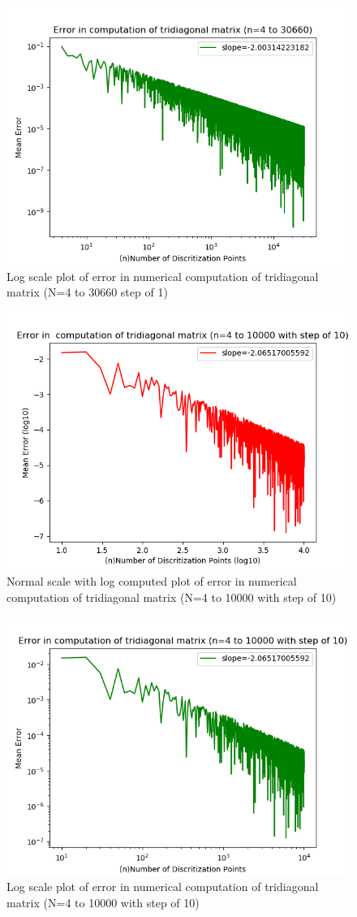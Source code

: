 \documentclass[preprint,12pt,3p]{elsarticle}
\begin{document}
 \begin{figure}[!htbp]
\centering
\includegraphics[width=0.7\linewidth]{data1_PLlog.png}
\caption{Log scale plot of error in numerical computation of tridiagonal matrix (N=4 to 30660 step of 1)}
\label{fig:data1_PLlog}
\end{figure}


\begin{figure}[!htbp]
\centering
\includegraphics[width=0.7\linewidth]{data2_NPlog.png}
\caption{Normal scale with log computed plot of error in numerical computation of tridiagonal matrix (N=4 to 10000 with step of 10)}
\label{fig:data2_NPlog}
\end{figure}


\begin{figure}[!htbp]
\centering
\includegraphics[width=0.7\linewidth]{data2_PLlog.png}
\caption{Log scale plot of error in numerical computation of tridiagonal matrix (N=4 to 10000 with step of 10)}
\label{fig:data2_PLlog}
\end{figure}
\end{document}
